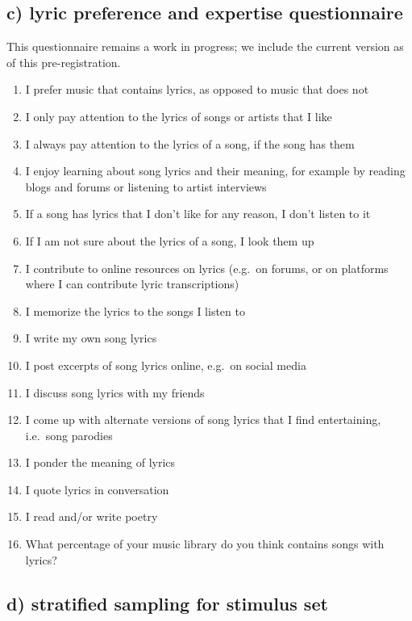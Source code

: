 \documentclass[
  letterpaper,
  DIV=11,
  numbers=noendperiod]{scrartcl}
\providecommand{\tightlist}{%
  \setlength{\itemsep}{0pt}\setlength{\parskip}{0pt}}\usepackage{longtable,booktabs,array}
\begin{document}
\hypertarget{sec-lyricquestions}{%
\subsection{c) lyric preference and expertise
questionnaire}\label{sec-lyricquestions}}

This questionnaire remains a work in progress; we include the current
version as of this pre-registration.

\begin{enumerate}
\def\labelenumi{\arabic{enumi}.}
\tightlist
\item
  I prefer music that contains lyrics, as opposed to music that does not
\item
  I only pay attention to the lyrics of songs or artists that I like
\item
  I always pay attention to the lyrics of a song, if the song has them
\item
  I enjoy learning about song lyrics and their meaning, for example by
  reading blogs and forums or listening to artist interviews
\item
  If a song has lyrics that I don't like for any reason, I don't listen
  to it
\item
  If I am not sure about the lyrics of a song, I look them up
\item
  I contribute to online resources on lyrics (e.g.~on forums, or on
  platforms where I can contribute lyric transcriptions)
\item
  I memorize the lyrics to the songs I listen to
\item
  I write my own song lyrics
\item
  I post excerpts of song lyrics online, e.g.~on social media
\item
  I discuss song lyrics with my friends
\item
  I come up with alternate versions of song lyrics that I find
  entertaining, i.e.~song parodies
\item
  I ponder the meaning of lyrics
\item
  I quote lyrics in conversation
\item
  I read and/or write poetry
\item
  What percentage of your music library do you think contains songs with
  lyrics?
\end{enumerate}

\hypertarget{sec-stratifiedsampling}{%
\subsection{d) stratified sampling for stimulus
set}\label{sec-stratifiedsampling}}
\end{document}
